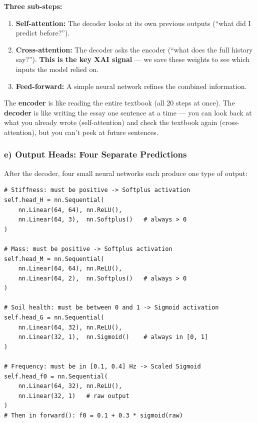 \documentclass[11pt,a4paper]{article}
\begin{document}
\textbf{Three sub-steps:}
\begin{enumerate}[nosep]
  \item \textbf{Self-attention:}  The decoder looks at its own previous
        outputs (``what did I predict before?'').
  \item \textbf{Cross-attention:}  The decoder asks the encoder
        (``what does the full history say?'').  \textbf{This is the
        key XAI signal} --- we save these weights to see which inputs
        the model relied on.
  \item \textbf{Feed-forward:}  A simple neural network refines the
        combined information.
\end{enumerate}

\begin{analogybox}
The \textbf{encoder} is like reading the entire textbook (all 20 steps
at once).  The \textbf{decoder} is like writing the essay one sentence
at a time --- you can look back at what you already wrote
(self-attention) and check the textbook again (cross-attention), but
you can't peek at future sentences.
\end{analogybox}

\subsubsection{e) Output Heads: Four Separate Predictions}

After the decoder, four small neural networks each produce one type
of output:

\begin{lstlisting}
# Stiffness: must be positive -> Softplus activation
self.head_H = nn.Sequential(
    nn.Linear(64, 64), nn.ReLU(),
    nn.Linear(64, 3),  nn.Softplus()   # always > 0
)

# Mass: must be positive -> Softplus activation
self.head_M = nn.Sequential(
    nn.Linear(64, 64), nn.ReLU(),
    nn.Linear(64, 2),  nn.Softplus()   # always > 0
)

# Soil health: must be between 0 and 1 -> Sigmoid activation
self.head_G = nn.Sequential(
    nn.Linear(64, 32), nn.ReLU(),
    nn.Linear(32, 1),  nn.Sigmoid()    # always in [0, 1]
)

# Frequency: must be in [0.1, 0.4] Hz -> Scaled Sigmoid
self.head_f0 = nn.Sequential(
    nn.Linear(64, 32), nn.ReLU(),
    nn.Linear(32, 1)   # raw output
)
# Then in forward(): f0 = 0.1 + 0.3 * sigmoid(raw)
\end{lstlisting}
\end{document}
